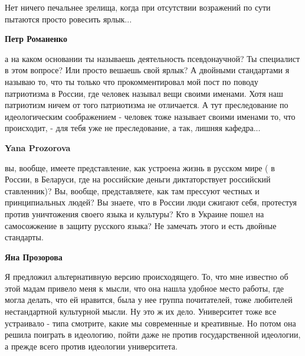 \begin{itemize}
\begin{itemize}
Нет ничего печальнее зрелища, когда при отсутствии возражений по сути пытаются
просто ровесить ярлык...

 
\textbf{Петр Романенко} 

а на каком основании ты называешь деятельность псевдонаучной? Ты специалист в
этом вопросе? Или просто вешаешь свой ярлык? А двойными стандартами я называю
то, что ты только что прокомментировал мой пост по поводу патриотизма в России,
где человек называл вещи своими именами. Хотя наш патриотизм ничем от того
патриотизма не отличается. А тут преследование по идеологическим соображением -
человек тоже называет своими именами то, что происходит, - для тебя уже не
преследование, а так, лишняя кафедра...


 
\textbf{Yana Prozorova} 

вы, вообще, имеете представление, как устроена жизнь в русском мире ( в России,
в Беларуси, где на российские деньги диктаторствует российский ставленник)? Вы,
вообще, представляете, как там прессуют честных и принципиальных людей? Вы
знаете, что в России люди сжигают себя, протестуя против уничтожения своего
языка и культуры? Кто в Украине пошел на самосожжение в защиту русского языка?
Не замечать этого и есть двойные стандарты.

 

\textbf{Яна Прозорова} 

Я предложил альтернативную версию происходящего. То, что мне известно об этой
мадам привело меня к мысли, что она нашла удобное место работы, где могла
делать, что ей нравится, была у нее группа почитателей, тоже любителей
нестандартной культурной мысли. Ну это ж их дело. Университет тоже все
устраивало - типа смотрите, какие мы современные и креативные. Но потом она
решила поиграть в идеологию, пойти даже не против государственной идеологии, а
прежде всего против идеологии университета. 


\end{itemize}
\end{itemize}
